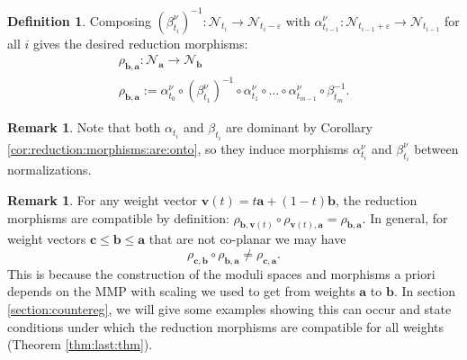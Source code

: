 \documentclass[11pt]{amsart}
\theoremstyle{definition}
\newtheorem{definition}[theorem]{Definition}
\newtheorem{remark}[theorem]{Remark}
\theoremstyle{remark}
\newcommand{\sN}{\mathscr{N}}
\newcommand{\bfa}{\mathbf{a}}
\newcommand{\bfv}{\mathbf{v}}
\newcommand{\bfb}{\mathbf{b}}
\newcommand{\bfc}{\mathbf{c}}
\begin{document}
	\begin{definition}\label{def:reduction}
		Composing $(\beta_{t_i}^\nu)^{-1} : \sN_{t_i} \to \sN_{t_i-\varepsilon}$ with $\alpha^\nu_{t_{i-1}} : \sN_{t_{i-1} + \varepsilon} \to \sN_{t_{i - 1}}$ for all $i$ gives the desired reduction morphisms:
		$$
		\begin{array}{c}
			\rho_{\bfb,\bfa}:\sN_{\mathbf{a}} \to \sN_{\mathbf{b}} \\ \rho_{\bfb, \bfa} := \alpha_{t_0}^\nu \circ (\beta_{t_1}^\nu)^{-1} \circ \alpha_{t_1}^\nu \circ \ldots \circ \alpha_{t_{m-1}}^\nu \circ \beta_{t_m}^{-1}.
		\end{array}
		$$
	\end{definition}
	
	\begin{remark} Note that both $\alpha_{t_i}$ and $\beta_{t_i}$ are dominant by Corollary \ref{cor:reduction:morphisms:are:onto}, so they induce morphisms $\alpha_{t_i}^\nu$ and $\beta_{t_i}^\nu$ between normalizations. \end{remark}
	
	\begin{remark}\label{rem:composition} For any weight vector $\bfv(t) = t\bfa + (1-t)\bfb$, the reduction morphisms are compatible by definition: $\rho_{\bfb, \bfv(t)} \circ \rho_{\bfv(t), \bfa} = \rho_{\bfb, \bfa}$. In general, for weight vectors $\bfc \le \bfb \le \bfa$ that are not co-planar we may have
		$$
		\rho_{\bfc, \bfb} \circ \rho_{\bfb, \bfa} \neq \rho_{\bfc, \bfa}. 
		$$
		This is because the construction of the moduli spaces and morphisms a priori depends on the MMP with scaling we used to get from weights $\bfa$ to $\bfb$. In section \ref{section:countereg}, we will give some examples showing this can occur and state conditions under which the reduction morphisms are compatible for all weights (Theorem \ref{thm:last:thm}). 
	\end{remark}
	
\end{document}

